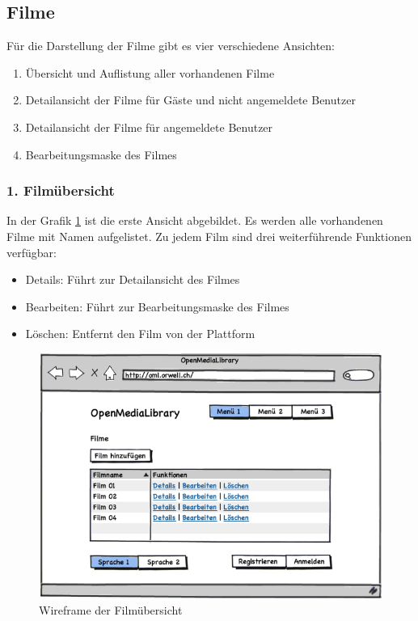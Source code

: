 \subsection{Filme}
Für die Darstellung der Filme gibt es vier verschiedene Ansichten:

\begin{enumerate}
    \item Übersicht und Auflistung aller vorhandenen Filme
    \item Detailansicht der Filme für Gäste und nicht angemeldete Benutzer
    \item Detailansicht der Filme für angemeldete Benutzer
    \item Bearbeitungsmaske des Filmes
\end{enumerate}

\subsubsection{1. Filmübersicht}
In der Grafik \ref{04_01_uebersicht} ist die erste Ansicht abgebildet. Es werden
alle vorhandenen Filme mit Namen aufgelistet. Zu jedem Film sind drei weiterführende
Funktionen verfügbar:

\begin{itemize}
    \item Details: Führt zur Detailansicht des Filmes
    \item Bearbeiten: Führt zur Bearbeitungsmaske des Filmes
    \item Löschen: Entfernt den Film von der Plattform
\end{itemize}

\begin{figure}[ht]
    \begin{center}
        \includegraphics[width=1\textwidth,angle=0]{./wireframes/04_01_uebersicht.png}
        \caption{Wireframe der Filmübersicht}
        \label{04_01_uebersicht}
    \end{center}
\end{figure}

